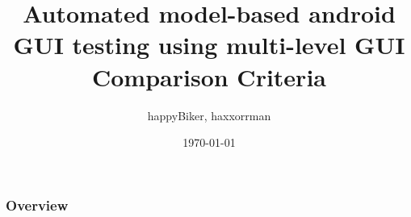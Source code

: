 \documentclass[12pt]{beamer}
\title[Short title]{Automated model-based android GUI testing using multi-level GUI Comparison Criteria} %
\author{happyBiker, haxxorrman} %
\institute[Sapienza] %
{
Flatulenza, University of Prone \\ %
\medskip
\textit{homemadebike.9999999@stud.unipronax.fritt,} %
\textit{lexusGTsportage.99999999@stud.unipronax.fritt}

}
\date{\today} %
\begin{document}
\begin{frame}
\titlepage %
\end{frame}

\begin{frame}
\frametitle{Overview} %
\tableofcontents %
\end{frame}




\end{document}
